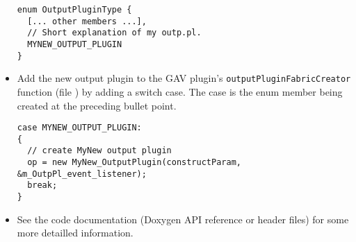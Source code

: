 \begin{itemize}
    \begin{lstlisting}
enum OutputPluginType {
  [... other members ...],
  // Short explanation of my outp.pl.
  MYNEW_OUTPUT_PLUGIN
}
    \end{lstlisting}
  \item Add the new output plugin to the GAV plugin's \lstinline|outputPluginFabricCreator| function (file ) by adding a switch case. The case is the enum member being created at the preceding bullet point.
    \begin{lstlisting}
case MYNEW_OUTPUT_PLUGIN:
{
  // create MyNew output plugin
  op = new MyNew_OutputPlugin(constructParam, &m_OutpPl_event_listener);
  break;
}
    \end{lstlisting}
  \item See the code documentation (Doxygen API reference or header files) for some more detailled information.


\end{itemize}

